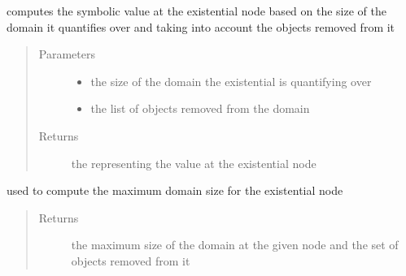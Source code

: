 \documentclass[letterpaper,10pt,english,openany,oneside]{sphinxmanual}
\begin{document}
\begin{fulllineitems}
\begin{fulllineitems}
\label{\detokenize{index:circuit.ExistsNode.compute}}
computes the symbolic value at the existential node based on the size of the domain it quantifies over and taking into account the
objects removed from it
\begin{quote}\begin{description}
\item[{Parameters}] \leavevmode\begin{itemize}
\item {} 
 \textendash{} the size of the domain the existential is quantifying over

\item {} 
 \textendash{} the list of objects removed from the domain

\end{itemize}

\item[{Returns}] \leavevmode
the {\hyperref[\detokenize{index:term.Term}]{}} representing the value at the existential node

\end{description}\end{quote}

\end{fulllineitems}


\begin{fulllineitems}
\label{\detokenize{index:circuit.ExistsNode.maxDomainSize}}
used to compute the maximum domain size for the existential node
\begin{quote}\begin{description}
\item[{Returns}] \leavevmode
the maximum size of the domain at the given node and the set of objects removed from it

\end{description}\end{quote}

\end{fulllineitems}


\end{fulllineitems}
\end{document}
